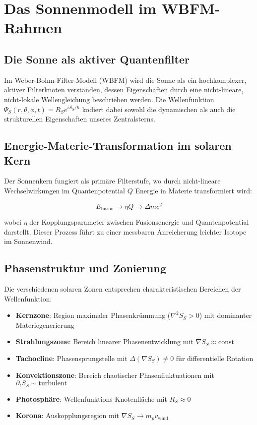 \chapter{Das Sonnenmodell im WBFM-Rahmen}

\section{Die Sonne als aktiver Quantenfilter}

Im Weber-Bohm-Filter-Modell (WBFM) wird die Sonne als ein hochkomplexer, aktiver Filterknoten verstanden, dessen Eigenschaften durch eine nicht-lineare, nicht-lokale Wellengleichung beschrieben werden. Die Wellenfunktion \(\Psi_S(r, \theta, \phi, t) = R_S e^{iS_S/\hbar}\) kodiert dabei sowohl die dynamischen als auch die strukturellen Eigenschaften unseres Zentralsterns.

\section{Energie-Materie-Transformation im solaren Kern}

Der Sonnenkern fungiert als primäre Filterstufe, wo durch nicht-lineare Wechselwirkungen im Quantenpotential \(Q\) Energie in Materie transformiert wird:

\[
E_{\text{fusion}} \rightarrow \eta Q \rightarrow \Delta m c^2
\]

wobei \(\eta\) der Kopplungsparameter zwischen Fusionsenergie und Quantenpotential darstellt. Dieser Prozess führt zu einer messbaren Anreicherung leichter Isotope im Sonnenwind.

\section{Phasenstruktur und Zonierung}

Die verschiedenen solaren Zonen entsprechen charakteristischen Bereichen der Wellenfunktion:

\begin{itemize}
\item \textbf{Kernzone}: Region maximaler Phasenkrümmung (\(\nabla^2 S_S > 0\)) mit dominanter Materiegenerierung
\item \textbf{Strahlungszone}: Bereich linearer Phasenentwicklung mit \(\nabla S_S \approx \text{const}\)
\item \textbf{Tachocline}: Phasensprungstelle mit \(\Delta(\nabla S_S) \neq 0\) für differentielle Rotation
\item \textbf{Konvektionszone}: Bereich chaotischer Phasenfluktuationen mit \(\partial_t S_S \sim \text{turbulent}\)
\item \textbf{Photosphäre}: Wellenfunktions-Knotenfläche mit \(R_S \approx 0\)
\item \textbf{Korona}: Auskopplungsregion mit \(\nabla S_S \rightarrow m_p v_{\text{wind}}\)
\end{itemize}

